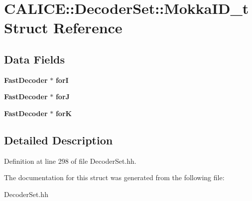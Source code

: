 \section{C\-A\-L\-I\-C\-E\-:\-:Decoder\-Set\-:\-:Mokka\-I\-D\-\_\-t Struct Reference}
\label{structCALICE_1_1DecoderSet_1_1MokkaID__t}
\subsection*{Data Fields}
\begin{DoxyCompactItemize}
\item 
{\bf Fast\-Decoder} $\ast$ {\bfseries for\-I}\label{structCALICE_1_1DecoderSet_1_1MokkaID__t_a4f0b95ad71486efa86b4cff6fad0a1fd}

\item 
{\bf Fast\-Decoder} $\ast$ {\bfseries for\-J}\label{structCALICE_1_1DecoderSet_1_1MokkaID__t_a0e74909c84cf269f74f3e39427136812}

\item 
{\bf Fast\-Decoder} $\ast$ {\bfseries for\-K}\label{structCALICE_1_1DecoderSet_1_1MokkaID__t_aaf7d5981f495355e40c1dc75b0627fa5}

\end{DoxyCompactItemize}


\subsection{Detailed Description}


Definition at line 298 of file Decoder\-Set.\-hh.



The documentation for this struct was generated from the following file\-:\begin{DoxyCompactItemize}
\item 
Decoder\-Set.\-hh\end{DoxyCompactItemize}
